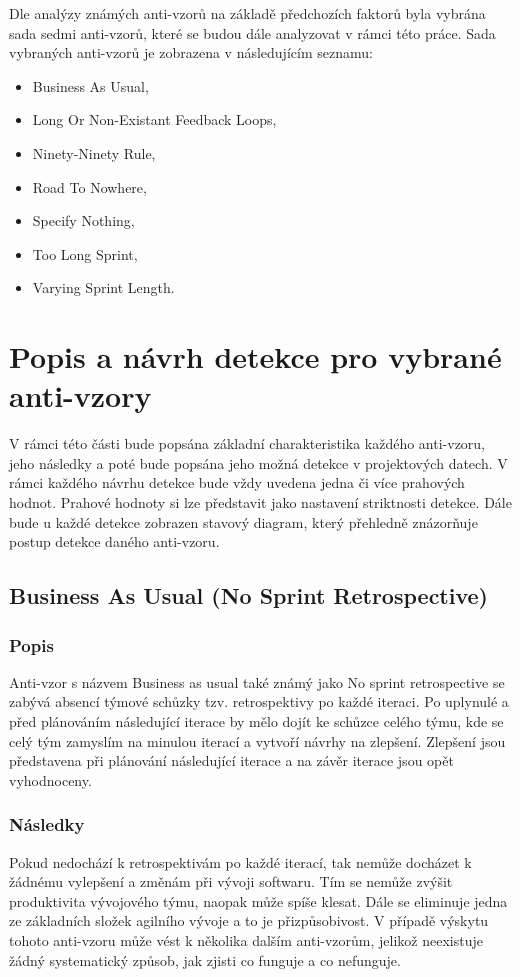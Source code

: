 \documentclass[czech,DP]{thesiskiv}
\begin{document}
\par
Dle analýzy známých anti-vzorů na základě předchozích faktorů byla vybrána sada sedmi anti-vzorů, které se budou dále analyzovat v rámci této práce. Sada vybraných anti-vzorů je zobrazena v následujícím seznamu:
\begin{itemize}
    \item Business As Usual,
    \item Long Or Non-Existant Feedback Loops,
    \item Ninety-Ninety Rule,
    \item Road To Nowhere,
    \item Specify Nothing,
    \item Too Long Sprint,
    \item Varying Sprint Length.
\end{itemize}
\section{Popis a návrh detekce pro vybrané anti-vzory}\label{sec:antipattern_analyzation}
V rámci této části bude popsána základní charakteristika každého anti-vzoru, jeho následky a poté bude popsána jeho možná detekce v projektových datech. V rámci každého návrhu detekce bude vždy uvedena jedna či více prahových hodnot. Prahové hodnoty si lze představit jako nastavení striktnosti detekce. Dále bude u každé detekce zobrazen stavový diagram, který přehledně znázorňuje postup detekce daného anti-vzoru.
\subsection{Business As Usual (No Sprint Retrospective)}
\subsubsection{Popis}
Anti-vzor s názvem Business as usual také známý jako No sprint retrospective se zabývá absencí týmové schůzky tzv. retrospektivy po každé iteraci. Po uplynulé a před plánováním následující iterace by mělo dojít ke schůzce celého týmu, kde se celý tým zamyslím na minulou iterací a vytvoří návrhy na zlepšení. Zlepšení jsou představena při plánování následující iterace a na závěr iterace jsou opět vyhodnoceny. \cite{scrum_but_anti_patterns}
\subsubsection{Následky}
Pokud nedochází k retrospektivám po každé iterací, tak nemůže docházet k žádnému vylepšení a změnám při vývoji softwaru. Tím se nemůže zvýšit produktivita vývojového týmu, naopak může spíše klesat. Dále se eliminuje jedna ze základních složek agilního vývoje a to je přizpůsobivost. V případě výskytu tohoto anti-vzoru může vést k několika dalším anti-vzorům, jelikož neexistuje žádný systematický způsob, jak zjisti co funguje a co nefunguje. \cite{scrum_but_anti_patterns}
\end{document}
